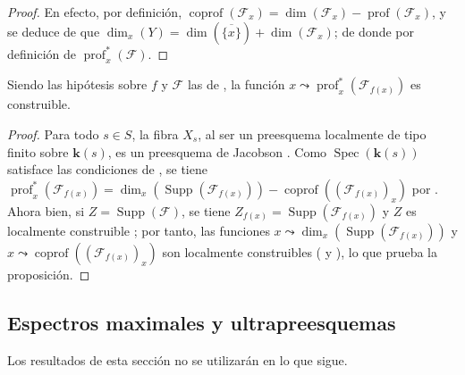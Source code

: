 \begin{proof}
En efecto, por definición, $\operatorname{coprof}(\mathcal F_x)
=\dim(\mathcal F_x)-\operatorname{prof}(\mathcal F_x)$, y se deduce de  que $\dim_x(Y)=\dim(\overline{\{x\}})+\dim(\mathcal F_x)$; de donde  por definición de $\operatorname{prof}^{*}_{x}(\mathcal F)$.
\end{proof}

\begin{corollary}[10.8.8]
\label{IV.10.8.8}
Siendo las hipótesis sobre $f$ y $\mathcal F$ las de , la función $x\leadsto\operatorname{prof}^{*}_{x}(\mathcal F_{f(x)})$ es construible.
\end{corollary}

\begin{proof}
Para todo $s\in S$, la fibra $X_s$, al ser un preesquema localmente de tipo finito sobre $\boldsymbol{k}(s)$, es un preesquema de Jacobson . Como $\operatorname{Spec}(\boldsymbol{k}(s))$ satisface las condiciones de , se tiene
$\operatorname{prof}^{*}_{x}(\mathcal F_{f(x)})
  =\dim_x(\operatorname{Supp}(\mathcal F_{f(x)}))
  -\operatorname{coprof}((\mathcal F_{f(x)})_x)$
por .
Ahora bien, si $Z=\operatorname{Supp}(\mathcal F)$, se tiene $Z_{f(x)}=\operatorname{Supp}(\mathcal F_{f(x)})$  y $Z$ es localmente construible ; por tanto, las funciones $x\leadsto\dim_x(\operatorname{Supp}(\mathcal F_{f(x)}))$ y $x\leadsto\operatorname{coprof}((\mathcal F_{f(x)})_x)$ son localmente construibles ( y ), lo que prueba la proposición.
\end{proof}

\subsection{Espectros maximales y ultrapreesquemas}
\label{subsection:IV.10.9}

Los resultados de esta sección no se utilizarán en lo que sigue.

